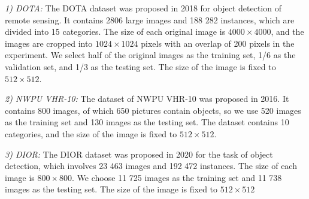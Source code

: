 \textit{1) DOTA:} The DOTA dataset was proposed in 2018 for object detection of remote sensing. It contains 2806 large images and 188 282 instances, which are divided into 15 categories. The size of each original image is $4000 \times 4000$, and the images are cropped into $1024 \times 1024$ pixels with an overlap of 200 pixels in the experiment. We select half of the original images as the training set, 1/6 as the validation set, and 1/3 as the testing set.  The size of the image is fixed to $512 \times 512$.

\textit{2) NWPU VHR-10:} The dataset of NWPU VHR-10 was proposed in 2016. It contains 800 images, of which 650 pictures contain objects, so we use 520 images as the training set and 130 images as the testing set. The dataset contains 10 categories, and the size of the image is fixed to $512 \times 512$. 

\textit{3) DIOR:} The DIOR dataset was proposed in 2020 for the task of object detection, which involves 23 463 images and 192 472 instances. The size of each image is $800 \times 800$. We choose 11 725 images as the training set and 11 738 images as the testing set. The size of the image is fixed to $512 \times 512$

